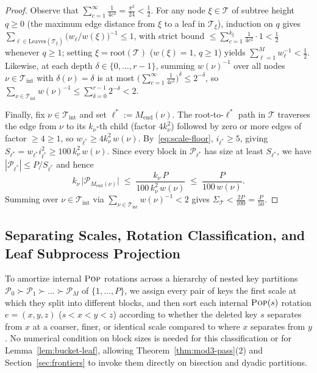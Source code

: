 \documentclass[11pt]{article}
\theoremstyle{definition}
\theoremstyle{remark}
\newcommand{\POP}{\textnormal{\scshape Pop}}
\begin{document}
\begin{proof}
Observe that $\sum_{c=1}^\infty \frac{1}{4 c^2} = \frac{\pi^2}{24} < \frac{1}{2}$. For any node $\xi \in \mathcal{T}$ of subtree height $q \ge 0$ (the maximum edge distance from $\xi$ to a leaf in $\mathcal{T}_\xi$), induction on $q$ gives $\sum_{\ell \in \mathrm{Leaves}(\mathcal{T}_\xi)} \big(w_\ell / w(\xi)\big)^{-1} \le 1$, with strict bound $\le \sum_{c=1}^{k_\xi} \frac{1}{4 c^2} \cdot 1 < \frac{1}{2}$ whenever $q \ge 1$; setting $\xi = \mathrm{root}(\mathcal{T})$ ($w(\xi) = 1$, $q \ge 1$) yields $\sum_{\ell=1}^M w_\ell^{-1} < \frac{1}{2}$. Likewise, at each depth $\delta \in \{0, \dots, r - 1\}$, summing $w(\nu)^{-1}$ over all nodes $\nu \in \mathcal{T}_{\mathrm{int}}$ with $\delta(\nu) = \delta$ is at most $\big(\sum_{c=1}^\infty \frac{1}{4 c^2}\big)^\delta \le 2^{-\delta}$, so $\sum_{\nu \in \mathcal{T}_{\mathrm{int}}} w(\nu)^{-1} \le \sum_{\delta=0}^{r-1} 2^{-\delta} < 2$.

Finally, fix $\nu \in \mathcal{T}_{\mathrm{int}}$ and set $\ell^* := M_{\mathrm{end}}(\nu)$. The root-to-$\ell^*$ path in $\mathcal{T}$ traverses the edge from $\nu$ to its $k_\nu$-th child (factor $4 k_\nu^2$) followed by zero or more edges of factor $\ge 4 \ge 1$, so $w_{\ell^*} \ge 4 k_\nu^2\,w(\nu)$. By~\eqref{eq:scale-floor}, $i_{\ell^*} \ge 5$, giving $S_{\ell^*} = w_{\ell^*} i_{\ell^*}^2 \ge 100\,k_\nu^2\,w(\nu)$. Since every block in $\mathcal{P}_{\ell^*}$ has size at least $S_{\ell^*}$, we have $|\mathcal{P}_{\ell^*}| \le P / S_{\ell^*}$ and hence
\[
k_\nu\,\big|\mathcal{P}_{M_{\mathrm{end}}(\nu)}\big| \;\le\; \frac{k_\nu\,P}{100\,k_\nu^2\,w(\nu)} \;\le\; \frac{P}{100\,w(\nu)}.
\]
Summing over $\nu \in \mathcal{T}_{\mathrm{int}}$ via $\sum_{\nu \in \mathcal{T}_{\mathrm{int}}} w(\nu)^{-1} < 2$ gives $\Sigma_{\mathcal{T}} < \frac{2P}{100} = \frac{P}{50}$.
\end{proof}


\subsection{Separating Scales, Rotation Classification, and Leaf Subprocess Projection}
\label{subsec:bucket-defs}

To amortize internal $\POP$ rotations across a hierarchy of nested key partitions $\mathcal{P}_0 \succ \mathcal{P}_1 \succ \dots \succ \mathcal{P}_M$ of $\{1, \dots, P\}$, we assign every pair of keys the first scale at which they split into different blocks, and then sort each internal $\POP(s)$ rotation $e = (x, y, z)$ ($s < x < y < z$) according to whether the deleted key $s$ separates from $x$ at a coarser, finer, or identical scale compared to where $x$ separates from $y$. No numerical condition on block sizes is needed for this classification or for Lemma~\ref{lem:bucket-leaf}, allowing Theorem~\ref{thm:mod3-pass}(2) and Section~\ref{sec:frontiers} to invoke them directly on bisection and dyadic partitions.
\end{document}
